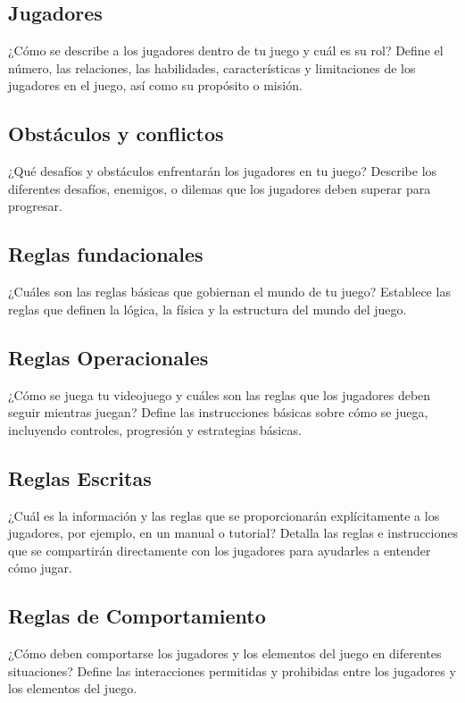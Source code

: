     \subsection{Jugadores}
    ¿Cómo se describe a los jugadores dentro de tu juego y cuál es su rol?
    Define el número, las relaciones, las habilidades, características y limitaciones de los jugadores en el juego, así como su propósito o misión.

    \subsection{Obstáculos y conflictos}
    ¿Qué desafíos y obstáculos enfrentarán los jugadores en tu juego?
    Describe los diferentes desafíos, enemigos, o dilemas que los jugadores deben superar para progresar.

    \subsection{Reglas fundacionales}
    ¿Cuáles son las reglas básicas que gobiernan el mundo de tu juego?
    Establece las reglas que definen la lógica, la física y la estructura del mundo del juego.

    \subsection{Reglas Operacionales}
    ¿Cómo se juega tu videojuego y cuáles son las reglas que los jugadores deben seguir mientras juegan?
    Define las instrucciones básicas sobre cómo se juega, incluyendo controles, progresión y estrategias básicas.

    \subsection{Reglas Escritas}
    ¿Cuál es la información y las reglas que se proporcionarán explícitamente a los jugadores, por ejemplo, en un manual o tutorial?
    Detalla las reglas e instrucciones que se compartirán directamente con los jugadores para ayudarles a entender cómo jugar.

    \subsection{Reglas de Comportamiento}
    ¿Cómo deben comportarse los jugadores y los elementos del juego en diferentes situaciones?
    Define las interacciones permitidas y prohibidas entre los jugadores y los elementos del juego.


